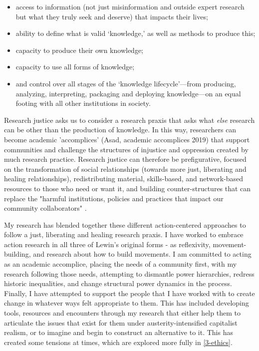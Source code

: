 \begin{itemize}
\item access to information (not just misinformation and outside expert research but what they truly seek and deserve) that impacts their lives; 
\item ability to define what is valid ‘knowledge,' as well as methods to produce this; 
\item capacity to produce their own knowledge; 
\item capacity to use all forms of knowledge; 
\item and control over all stages of the ‘knowledge lifecycle'—from producing, analyzing, interpreting, packaging and deploying knowledge—on an equal footing with all other institutions in society. \cite{jolivette_research_2015 location 288}
\end{itemize}

Research justice asks us to consider a research praxis that asks what \textit{else} research can be other than the production of knowledge. In this way, researchers can become academic 'accomplices' (Asad, academic accomplices 2019) that support communities and challenge the structures of injustice and oppression created by much research practice.  Research justice can therefore be prefigurative, focused on the transformation of social relationships (towards more just, liberating and healing relationships), redistributing material, skills-based, and network-based resources to those who need or want it, and building counter-structures that can replace the "harmful institutions, policies and practices that impact our community collaborators" \cite{asad_prefigurative_2019 13}.

My research has blended together these different action-centered approaches to follow a just, liberating and healing research praxis. I have worked to embrace action research in all three of Lewin's original forms - as reflexivity, movement-building, and research about how to build movements. I am committed to acting as an academic accomplice, placing the needs of a community first, with my research following those needs, attempting to dismantle power hierarchies, redress historic inequalities, and change structural power dynamics in the process. Finally, I have attempted to support the people that I have worked with to create change in whatever ways felt appropriate to them. This has included developing tools, resources and encounters through my research that either help them to articulate the issues that exist for them under austerity-intensified capitalist realism, or to imagine and begin to construct an alternative to it. This has created some tensions at times, which are explored more fully in \ref{3-ethics}. 

